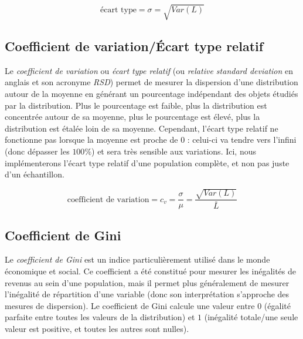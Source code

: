\begin{center}
\begin{equation*}
\text{écart type} = \sigma = \sqrt{Var(L)}
\end{equation*}
\end{center}



\bigskip


\subsection{Coefficient de variation/\'Ecart type relatif}

\noindent Le \textit{coefficient de variation} ou \textit{écart type relatif} (ou \textit{relative standard deviation} en anglais et son acronyme \textit{RSD}) permet de mesurer la dispersion d'une distribution autour de la moyenne en générant un pourcentage indépendant des objets étudiés par la distribution.
Plus le pourcentage est faible, plus la distribution est concentrée autour de sa moyenne, plus le pourcentage est élevé, plus la distribution est étalée loin de sa moyenne.
Cependant, l'écart type relatif ne fonctionne pas lorsque la moyenne est proche de $ 0 $ : celui-ci va tendre vers l'infini (donc dépasser les $ 100\% $) et sera très sensible aux variations.
Ici, nous implémenterons l'écart type relatif d'une population complète, et non pas juste d'un échantillon.

\begin{center}
\begin{equation*}
\text{coefficient de variation} = c_{v} = \frac{\sigma}{\mu} = \frac{\sqrt{Var(L)}}{\bar{L}}
\end{equation*}
\end{center}



\bigskip


\subsection{Coefficient de Gini}

\noindent Le \textit{coefficient de Gini} est un indice particulièrement utilisé dans le monde économique et social.
Ce coefficient a été constitué pour mesurer les inégalités de revenus au sein d'une population, mais il permet plus généralement de mesurer l'inégalité de répartition d'une variable (donc son interprétation s'approche des mesures de dispersion).
Le coefficient de Gini calcule une valeur entre $ 0 $ (égalité parfaite entre toutes les valeurs de la distribution) et $ 1 $ (inégalité totale/une seule valeur est positive, et toutes les autres sont nulles).

